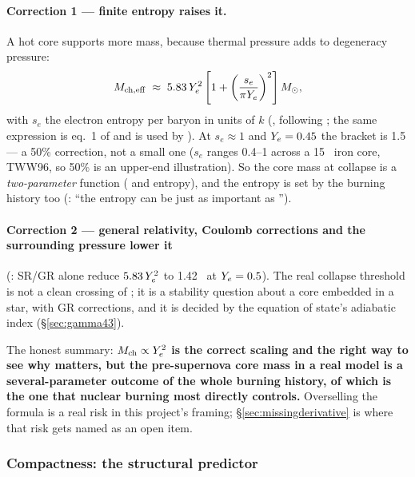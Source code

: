 \paragraph{Correction 1 --- finite entropy raises it.} A hot core supports more
mass, because thermal pressure adds to degeneracy pressure:
%
\begin{equation}
M_{\mathrm{ch,eff}} \;\approx\; 5.83\,Y_{e}^{2}\left[1 + \left(\frac{s_e}{\pi Y_{e}}\right)^{2}\right] M_{\odot} ,
\label{eq:mcheff}
\end{equation}
%
with $s_e$ the electron entropy per baryon in units of $k$
(\citealt[eq.~6]{timmes1996}, following \citealt{baron1990}; the same expression
is eq.~1 of \citealt{heger2001} and is used by \citealt{suwa2018}). At
$s_e \approx 1$ and $Y_{e} = 0.45$ the bracket is 1.5 --- a 50\% correction, not
a small one ($s_e$ ranges 0.4--1 across a 15~\Msun{} iron core, TWW96, so 50\%
is an upper-end illustration). So the core mass at collapse is a
\emph{two-parameter} function (\Ye{} and entropy), and the entropy is set by
the burning history too (\citealt{heger2001}: ``the entropy can be just as
important as \Ye'').

\paragraph{Correction 2 --- general relativity, Coulomb corrections and the
surrounding pressure lower it} (\citealt{timmes1996}: SR/GR alone reduce
$5.83\,Y_{e}^2$ to 1.42~\Msun{} at $Y_{e} = 0.5$). The real collapse threshold is
not a clean crossing of \Mch; it is a stability question about a core embedded
in a star, with GR corrections, and it is decided by the equation of state's
adiabatic index (\S\ref{sec:gamma43}).

The honest summary: \textbf{$M_{\mathrm{ch}} \propto Y_{e}^2$ is the correct scaling and the
right way to see why \Ye{} matters, but the pre-supernova core mass in a real
model is a several-parameter outcome of the whole burning history, of which
\Ye{} is the one that nuclear burning most directly controls.} Overselling the
formula is a real risk in this project's framing; \S\ref{sec:missingderivative}
is where that risk gets named as an open item.

\subsubsection{Compactness: the structural predictor}
\label{sec:compactness}

